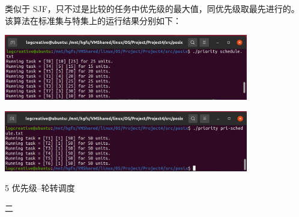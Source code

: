 \documentclass[12pt,a4paper]{article}
\newenvironment{problems}{\begin{list}{}{\renewcommand{\makelabel}[1]{\textbf{##1}\hfil}}}{\end{list}}
\newenvironment{steps}{\begin{list}{}{\renewcommand{\makelabel}[1]{##1.\hfil}}}{\end{list}}
\begin{document}
\begin{problems}
\begin{steps}
        

        类似于 SJF，只不过是比较的任务中优先级的最大值，同优先级取最先进行的。该算法在标准集与特集上的运行结果分别如下：

        \includegraphics[width=0.8\textwidth]{pri1.png}

        \includegraphics[width=0.8\textwidth]{pri2.png}
        
        \item[5] 优先级--轮转调度
        


    \end{steps}
    \item[二] 
\end{problems} 
\end{document}
